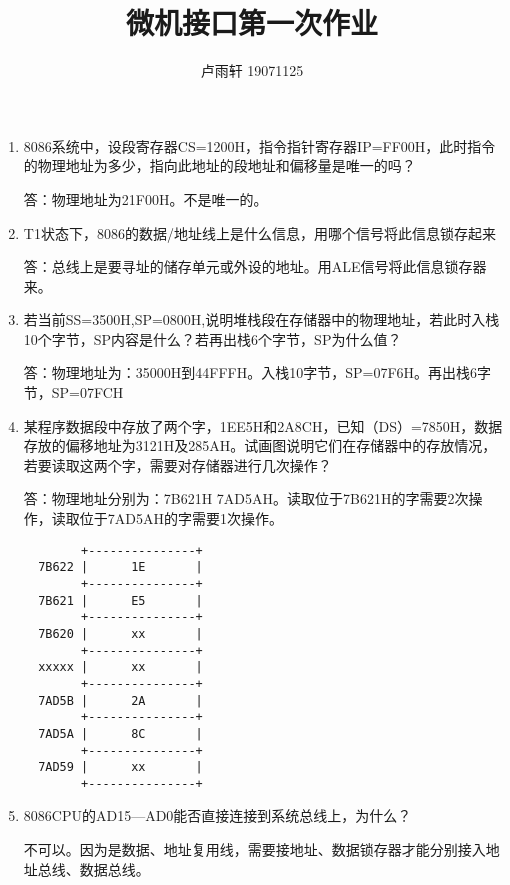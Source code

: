 \documentclass{ctexart}
\title{微机接口第一次作业}
\author{卢雨轩 19071125}
\makeatletter
\newcommand{\nextverbatimspread}[1]{%
  \def\verbatim@font{%
    \linespread{#1}\normalfont\ttfamily%
    \gdef\verbatim@font{\normalfont\ttfamily}}%
}
\makeatother
\begin{document}
\maketitle

\begin{enumerate}
    \item 8086系统中，设段寄存器CS=1200H，指令指针寄存器IP=FF00H，此时指令的物理地址为多少，指向此地址的段地址和偏移量是唯一的吗？

    答：物理地址为21F00H。不是唯一的。

    \item T1状态下，8086的数据/地址线上是什么信息，用哪个信号将此信息锁存起来
    
    答：总线上是要寻址的储存单元或外设的地址。用ALE信号将此信息锁存器来。
    
    \item 若当前SS=3500H,SP=0800H,说明堆栈段在存储器中的物理地址，若此时入栈10个字节，SP内容是什么？若再出栈6个字节，SP为什么值？
    
    答：物理地址为：35000H到44FFFH。入栈10字节，SP=07F6H。再出栈6字节，SP=07FCH
    
    \item 某程序数据段中存放了两个字，1EE5H和2A8CH，已知（DS）=7850H，数据存放的偏移地址为3121H及285AH。试画图说明它们在存储器中的存放情况，若要读取这两个字，需要对存储器进行几次操作？
    
    答：物理地址分别为：7B621H 7AD5AH。读取位于7B621H的字需要2次操作，读取位于7AD5AH的字需要1次操作。
    \nextverbatimspread{1}
    \begin{verbatim}
        +---------------+
  7B622 |      1E       |
        +---------------+
  7B621 |      E5       |
        +---------------+
  7B620 |      xx       |
        +---------------+
  xxxxx |      xx       |
        +---------------+
  7AD5B |      2A       |
        +---------------+
  7AD5A |      8C       |
        +---------------+
  7AD59 |      xx       |
        +---------------+
    \end{verbatim}
    
    \item 8086CPU的AD15—AD0能否直接连接到系统总线上，为什么？
    
    不可以。因为是数据、地址复用线，需要接地址、数据锁存器才能分别接入地址总线、数据总线。
\end{enumerate}
\end{document}
